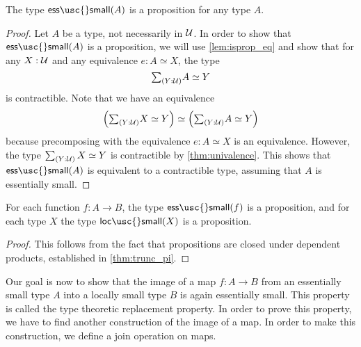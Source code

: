 \begin{lem}\label{lem:isprop_ess_small}
The type $\mathsf{ess\usc{}small}(A)$ is a proposition for any type $A$.
\end{lem}

\begin{proof}
Let $A$ be a type, not necessarily in $\mathcal{U}$. In order to show that $\mathsf{ess\usc{}small}(A)$ is a proposition, we will use \cref{lem:isprop_eq} and show that for any $X:\mathcal{U}$ and any equivalence $e:A\simeq X$, the type
\begin{equation*}
\sm{Y:\UU}\eqv{A}{Y}
\end{equation*}
is contractible. Note that we have an equivalence
\begin{equation*}
\eqv{\Big(\sm{Y:\UU}\eqv{X}{Y}\Big)}{\Big(\sm{Y:\UU}\eqv{A}{Y}\Big)}
\end{equation*}
because precomposing with the equivalence $e:A \simeq X$ is an equivalence. However, the type $\sm{Y:\UU}\eqv{X}{Y}$ is contractible by \cref{thm:univalence}. This shows that $\mathsf{ess\usc{}small}(A)$ is equivalent to a contractible type, assuming that $A$ is essentially small.
\end{proof}

\begin{cor}
For each function $f:A\to B$, the type $\mathsf{ess\usc{}small}(f)$ is a proposition, and for each type $X$ the type $\mathsf{loc\usc{}small}(X)$ is a proposition.
\end{cor}

\begin{proof}
This follows from the fact that propositions are closed under dependent products, established in \cref{thm:trunc_pi}.
\end{proof}

Our goal is now to show that the image of a map $f:A\to B$ from an essentially small type $A$ into a locally small type $B$ is again essentially small. This property is called the type theoretic replacement property. In order to prove this property, we have to find another construction of the image of a map. In order to make this construction, we define a join operation on maps.

